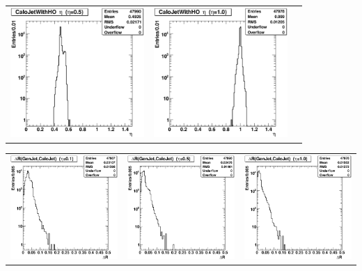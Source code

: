 \documentclass{cmspaper}
\begin{document}
\begin{appendices}
\begin{center}
\begin{tabular}{lll}
  \includegraphics[width=2in]{figs/h_CaloJetWithHOEta_corr_eta0.5.eps} &
  \includegraphics[width=2in]{figs/h_CaloJetWithHOEta_corr_eta1.0.eps} \\
 \end{tabular}
\end{center}
\begin{center}
 \begin{tabular}{lll}
  \includegraphics[width=2in]{figs/h_DeltaR_corr_eta0.1.eps} &
  \includegraphics[width=2in]{figs/h_DeltaR_corr_eta0.5.eps} &
  \includegraphics[width=2in]{figs/h_DeltaR_corr_eta1.0.eps} \\

\end{tabular}
\end{center}
\end{appendices}
\end{document}
